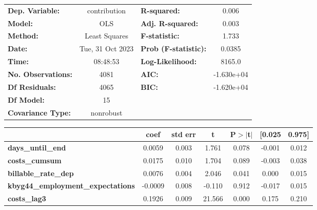 \begin{center}
\begin{tabular}{lclc}
\toprule
\textbf{Dep. Variable:}                   &   contribution   & \textbf{  R-squared:         } &     0.006   \\
\textbf{Model:}                           &       OLS        & \textbf{  Adj. R-squared:    } &     0.003   \\
\textbf{Method:}                          &  Least Squares   & \textbf{  F-statistic:       } &     1.733   \\
\textbf{Date:}                            & Tue, 31 Oct 2023 & \textbf{  Prob (F-statistic):} &   0.0385    \\
\textbf{Time:}                            &     08:48:53     & \textbf{  Log-Likelihood:    } &    8165.0   \\
\textbf{No. Observations:}                &        4081      & \textbf{  AIC:               } & -1.630e+04  \\
\textbf{Df Residuals:}                    &        4065      & \textbf{  BIC:               } & -1.620e+04  \\
\textbf{Df Model:}                        &          15      & \textbf{                     } &             \\
\textbf{Covariance Type:}                 &    nonrobust     & \textbf{                     } &             \\
\bottomrule
\end{tabular}
\begin{tabular}{lcccccc}
                                          & \textbf{coef} & \textbf{std err} & \textbf{t} & \textbf{P$> |$t$|$} & \textbf{[0.025} & \textbf{0.975]}  \\
\midrule
\textbf{days\_until\_end}                 &       0.0059  &        0.003     &     1.761  &         0.078        &       -0.001    &        0.012     \\
\textbf{costs\_cumsum}                    &       0.0175  &        0.010     &     1.704  &         0.089        &       -0.003    &        0.038     \\
\textbf{billable\_rate\_dep}              &       0.0076  &        0.004     &     2.046  &         0.041        &        0.000    &        0.015     \\
\textbf{kbyg44\_employment\_expectations} &      -0.0009  &        0.008     &    -0.110  &         0.912        &       -0.017    &        0.015     \\
\textbf{costs\_lag3}                      &       0.1926  &        0.009     &    21.566  &         0.000        &        0.175    &        0.210     \\

\end{tabular}
\end{center}
